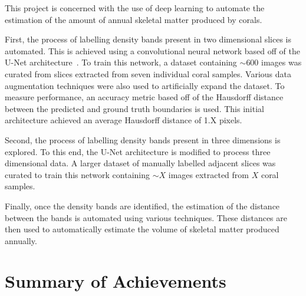 This project is concerned with the use of deep learning to automate the estimation of the amount of annual skeletal matter produced by corals.

First, the process of labelling density bands present in two dimensional slices is automated. This is achieved using a convolutional neural network based off of the U-Net architecture~\cite{ronneberger2015u}. To train this network, a dataset containing ${\sim}600$ images was curated from slices extracted from seven individual coral samples. Various data augmentation techniques were also used to artificially expand the dataset. To measure performance, an accuracy metric based off of the Hausdorff distance between the predicted and ground truth boundaries is used. This initial architecture achieved an average Hausdorff distance of 1.X pixels.

Second, the process of labelling density bands present in three dimensions is explored. To this end, the U-Net architecture is modified to process three dimensional data. A larger dataset of manually labelled adjacent slices was curated to train this network containing ${\sim}X$ images extracted from $X$ coral samples.

Finally, once the density bands are identified, the estimation of the distance between the bands is automated using various techniques. These distances are then used to automatically estimate the volume of skeletal matter produced annually.

\section*{Summary of Achievements}

